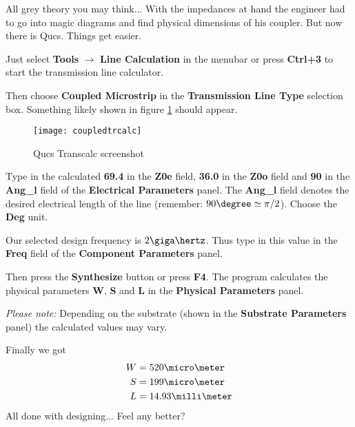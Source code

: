 
All grey theory you may think...  With the impedances at hand the
engineer had to go into magic diagrams and find physical dimensions of
his coupler.  But now there is Qucs.  Things get easier.

\addvspace{12pt}

Just select \textbf{Tools} $\rightarrow$ \textbf{Line Calculation} in
the menubar or press \textbf{Ctrl+3} to start the transmission line
calculator.

\addvspace{12pt}

Then choose \textbf{Coupled Microstrip} in the \textbf{Transmission
Line Type} selection box.  Something likely shown in figure
\ref{fig:trcalc} should appear.

\begin{figure}[ht]
  \centering
  \texttt{[image: coupledtrcalc]}
  \caption{Qucs Transcalc screenshot}
  \label{fig:trcalc}
\end{figure}
\FloatBarrier

Type in the calculated \textbf{69.4} in the \textbf{Z0e} field,
\textbf{36.0} in the \textbf{Z0o} field and \textbf{90} in the
\textbf{Ang\_l} field of the \textbf{Electrical Parameters} panel.
The \textbf{Ang\_l} field denotes the desired electrical length of the
line (remember: $90\degree \simeq \pi/2$).  Choose the \textbf{Deg}
unit.

\addvspace{12pt}

Our selected design frequency is $2\giga\hertz$.  Thus type in this
value in the \textbf{Freq} field of the \textbf{Component Parameters}
panel.

\addvspace{12pt}

Then press the \textbf{Synthesize} button or press \textbf{F4}.  The
program calculates the physical parameters \textbf{W}, \textbf{S} and
\textbf{L} in the \textbf{Physical Parameters} panel.

\addvspace{12pt}

\textit{Please note:} Depending on the substrate (shown in the
\textbf{Substrate Parameters} panel) the calculated values may vary.

\addvspace{12pt}

Finally we got
\begin{align*}
W &= 520 \micro\meter\\
S &= 199 \micro\meter\\
L &= 14.93 \milli\meter
\end{align*}
All done with designing...  Feel any better?

